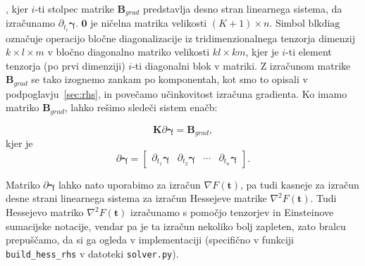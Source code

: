 \documentclass[isrm2, tisk]{fmfdelo}
\newcommand{\yimplicit}{\mathbf{\gamma}}
\newcommand{\kmat}{\mathbf{K}}
\newcommand{\tvec}{\mathbf{t}}
\begin{document}
, kjer $i$-ti stolpec matrike $\mathbf{B}_{grad}$ predstavlja desno stran linearnega sistema, da izračunamo $\partial_{t_i} \yimplicit$. $\mathbf{0}$ je ničelna matrika velikosti $(K+1)\times n$. Simbol $\text{blkdiag}$ označuje operacijo bločne diagonalizacije iz tridimenzionalnega tenzorja dimenzij $k \times l \times m$ v bločno diagonalno matriko velikosti $k l \times k m$, kjer je $i$-ti element tenzorja (po prvi dimenziji) $i$-ti diagonalni blok v matriki. Z izračunom matrike $\mathbf{B}_{grad}$ se tako izognemo zankam po komponentah, kot smo to opisali v podpoglavju~\ref{sec:rhs}, in povečamo učinkovitost izračuna gradienta. Ko imamo matriko $\mathbf{B}_{grad}$, lahko rešimo sledeči sistem enačb:

\begin{equation}
\kmat \partial\yimplicit = \mathbf{B}_{grad},
\end{equation}
kjer je 
\begin{equation}
\partial \yimplicit = \begin{bmatrix} \partial_{t_1} \yimplicit & \partial_{t_2} \yimplicit & \cdots & \partial_{t_n} \yimplicit \end{bmatrix}.
\end{equation}

Matriko $\partial \yimplicit$ lahko nato uporabimo za izračun $\nabla F(\tvec)$, pa tudi kasneje za izračun desne strani linearnega sistema za izračun Hessejeve matrike $\nabla^2 F(\tvec)$. Tudi Hessejevo matriko $\nabla^2 F(\tvec)$ izračunamo s pomočjo tenzorjev in Einsteinove sumacijske notacije, vendar pa je ta izračun nekoliko bolj zapleten, zato bralcu prepuščamo, da si ga ogleda v implementaciji (specifično v funkciji \texttt{build\_hess\_rhs} v datoteki \texttt{solver.py}).
\end{document}
